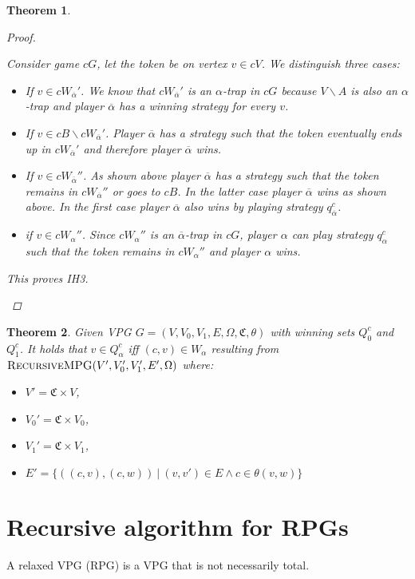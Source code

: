 \documentclass[]{article}
\newtheorem{theorem}{Theorem}[section]
\begin{document}
\begin{theorem}
\begin{proof}
\begin{itemize}
			Consider game $cG$, let the token be on vertex $v \in cV$. We distinguish three cases:
			\begin{itemize}
				\item If $v \in cW_{\overline{\alpha}}'$. We know that $cW_{\overline{\alpha}}'$ is an $\alpha$-trap in $cG$ because $V\backslash A$ is also an $\alpha$-trap and player $\overline{\alpha}$ has a winning strategy for every $v$.
				\item If $v \in cB \backslash cW_{\overline{\alpha}}'$. Player $\overline{\alpha}$ has a strategy such that the token eventually ends up in $cW_{\overline{\alpha}}'$ and therefore player $\overline{\alpha}$ wins.
				\item If $v \in cW_{\overline{\alpha}}''$. As shown above player $\overline{\alpha}$ has a strategy such that the token remains in $cW_{\overline{\alpha}}''$ or goes to $cB$. In the latter case player $\overline{\alpha}$ wins as shown above. In the first case player $\overline{\alpha}$ also wins by playing strategy $q_{\overline{\alpha}}^c$.
				\item if $v \in cW_\alpha''$. Since $cW_\alpha''$ is an $\overline{\alpha}$-trap in $cG$, player $\alpha$ can play strategy $q_\alpha^c$ such that the token remains in $cW_\alpha''$ and player $\alpha$ wins.
			\end{itemize}
		This proves IH3.
		\end{itemize}
	
	\end{proof}
\end{theorem}
\begin{theorem}
	Given VPG $G = (V,V_0,V_1,E,\Omega,\mathfrak{C},\theta)$ with winning sets $Q_0^c$ and $Q_1^c$. It holds that $v \in Q_\alpha^c$ iff $(c,v) \in W_\alpha$ resulting from $\textsc{RecursiveMPG}(V',V_0',V_1',E',\Omega)$ where:
	\begin{itemize}
		\item $V' = \mathfrak{C} \times V$,
		\item $V_0' = \mathfrak{C} \times V_0$,
		\item $V_1' = \mathfrak{C} \times V_1$,
		\item $E' = \{ ((c,v),(c,w))\ |\ (v,v') \in E \wedge c \in\theta(v,w) \}$
	\end{itemize}
\end{theorem}
\pagebreak
\section{Recursive algorithm for RPGs}
	A relaxed VPG (RPG) is a VPG that is not necessarily total.
	
\end{document}
